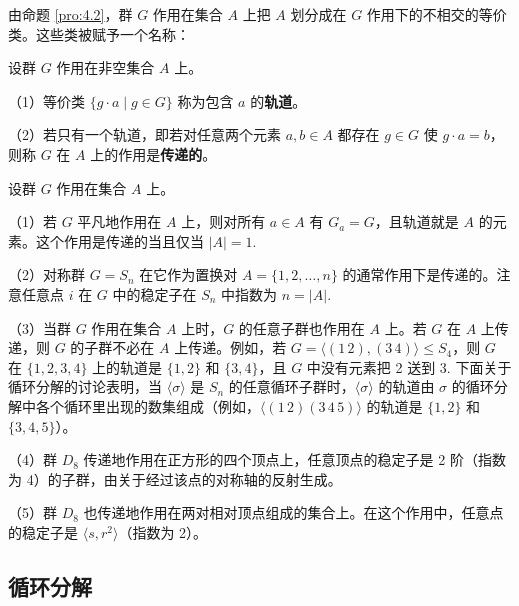 由命题 \ref{pro:4.2}，群 \(G\) 作用在集合 \(A\) 上把 \(A\) 划分成在 \(G\) 作用下的不相交的等价类。这些类被赋予一个名称：

\begin{definition}
设群 \(G\) 作用在非空集合 \(A\) 上。

（1）等价类 \(\{g \cdot a \mid g \in G\}\) 称为包含 \(a\) 的\textbf{轨道}。

（2）若只有一个轨道，即若对任意两个元素 \(a, b \in A\) 都存在 \(g \in G\) 使 \(g \cdot a = b\)，则称 \(G\) 在 \(A\) 上的作用是\textbf{传递的}。
\end{definition}

\begin{example}
设群 \(G\) 作用在集合 \(A\) 上。

（1）若 \(G\) 平凡地作用在 \(A\) 上，则对所有 \(a \in A\) 有 \(G_a = G\)，且轨道就是 \(A\) 的元素。这个作用是传递的当且仅当 \(|A| = 1\).

（2）对称群 \(G = S_n\) 在它作为置换对 \(A = \{1, 2, \ldots, n\}\) 的通常作用下是传递的。注意任意点 \(i\) 在 \(G\) 中的稳定子在 \(S_n\) 中指数为 \(n = |A|\).

（3）当群 \(G\) 作用在集合 \(A\) 上时，\(G\) 的任意子群也作用在 \(A\) 上。若 \(G\) 在 \(A\) 上传递，则 \(G\) 的子群不必在 \(A\) 上传递。例如，若 \(G = \langle (1\,2), (3\,4) \rangle \leq S_4\)，则 \(G\) 在 \(\{1, 2, 3, 4\}\) 上的轨道是 \(\{1, 2\}\) 和 \(\{3, 4\}\)，且 \(G\) 中没有元素把 2 送到 3. 下面关于循环分解的讨论表明，当 \(\langle \sigma \rangle\) 是 \(S_n\) 的任意循环子群时，\(\langle \sigma \rangle\) 的轨道由 \(\sigma\) 的循环分解中各个循环里出现的数集组成（例如，\(\langle (1\,2)(3\,4\,5) \rangle\) 的轨道是 \(\{1, 2\}\) 和 \(\{3, 4, 5\}\)）。

（4）群 \(D_8\) 传递地作用在正方形的四个顶点上，任意顶点的稳定子是 2 阶（指数为 4）的子群，由关于经过该点的对称轴的反射生成。

（5）群 \(D_8\) 也传递地作用在两对相对顶点组成的集合上。在这个作用中，任意点的稳定子是 \(\langle s, r^2 \rangle\)（指数为 2）。
\end{example}

\subsection*{循环分解}

